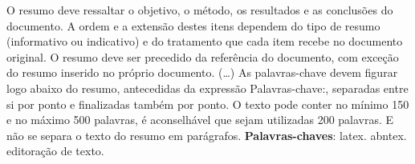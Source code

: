 
O resumo deve ressaltar o objetivo, o método, os resultados e as conclusões
do documento. A ordem e a extensão
destes itens dependem do tipo de resumo (informativo ou indicativo) e do
tratamento que cada item recebe no documento original. O resumo deve ser
precedido da referência do documento, com exceção do resumo inserido no
próprio documento. (\ldots) As palavras-chave devem figurar logo abaixo do
resumo, antecedidas da expressão Palavras-chave:, separadas entre si por
ponto e finalizadas também por ponto. O texto pode conter no mínimo 150 e
no máximo 500 palavras, é aconselhável que sejam utilizadas 200 palavras.
E não se separa o texto do resumo em parágrafos.
\vspace{\onelineskip}
\noindent
\textbf{Palavras-chaves}: latex. abntex. editoração de texto.
